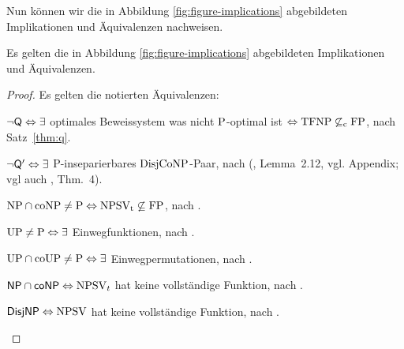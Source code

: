 Nun können wir die in Abbildung \ref{fig:figure-implications} abgebildeten Implikationen und Äquivalenzen nachweisen.
\begin{theorem}\label{thm:figure-implications}
    Es gelten die in Abbildung \ref{fig:figure-implications} abgebildeten Implikationen und Äquivalenzen.
\end{theorem}
\begin{proof}
    Es gelten die notierten Äquivalenzen:
    \begin{Prooflist}[nosep, midpenalty=0,label={\arabic*.},labelsep=3pt]
    \item $\neg\hQ \Leftrightarrow \exists$ optimales Beweissystem was nicht $\P$-optimal ist $\Leftrightarrow \TFNP\not\subseteq_\mathrm{c} \FP$, nach Satz~\ref{thm:q}.
    \item $\neg\hQ' \Leftrightarrow\exists$ P-inseparierbares $\DisjCoNP$-Paar, nach \citeauthor{fortnow_separability_1993} (\citeyear{fortnow_separability_1993}, Lemma~2.12, vgl. Appendix; vgl auch \cite{fenner_inverting_2003}, Thm.~4).
    \item $\NP\cap\coNP\neq\P \Leftrightarrow \NPSVt\not\subseteq\FP$, nach \textcite[Prop.~1]{fenner_inverting_2003}.
    \item $\UP\neq\P \Leftrightarrow\exists$ Einwegfunktionen, nach \textcite[Thm.~10]{grollmann_complexity_1988}.
    \item $\UP\cap\coUP\neq\P \Leftrightarrow\exists$ Einwegpermutationen, nach \textcite{homan_one-way_2003}.
    \item $\hNPcoNP \Leftrightarrow \NPSV_t$ hat keine vollständige Funktion, nach \textcite[Prop.~3]{beyersdorff_nondeterministic_2009}.
    \item $\hDisjNP \Leftrightarrow \NPSV$ hat keine vollständige Funktion, nach \textcite[Thm.~9]{glaser_reductions_2005}.
    \end{Prooflist}
    \vspace{0pt plus 6pt}


\end{proof}
